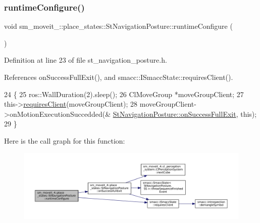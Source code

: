 \subsubsection{\texorpdfstring{runtime\+Configure()}{runtimeConfigure()}}
{\footnotesize\ttfamily void sm\+\_\+moveit\+\_\+::place\+\_\+states\+::\+St\+Navigation\+Posture\+::runtime\+Configure (\begin{DoxyParamCaption}{ }\end{DoxyParamCaption})\hspace{0.3cm}{\ttfamily [inline]}}



Definition at line 23 of file st\+\_\+navigation\+\_\+posture.\+h.



References on\+Success\+Full\+Exit(), and smacc\+::\+I\+Smacc\+State\+::requires\+Client().


\begin{DoxyCode}
24             \{
25                 ros::WallDuration(2).sleep();
26                 ClMoveGroup *moveGroupClient;
27                 this->\hyperlink{classsmacc_1_1ISmaccState_a7f95c9f0a6ea2d6f18d1aec0519de4ac}{requiresClient}(moveGroupClient);
28                 moveGroupClient->onMotionExecutionSuccedded(&
      \hyperlink{structsm__moveit__4_1_1place__states_1_1StNavigationPosture_a95ab74dae51538aeae46f71b515bc61e}{StNavigationPosture::onSuccessFullExit}, \textcolor{keyword}{this});
29             \}
\end{DoxyCode}
Here is the call graph for this function\+:
\nopagebreak
\begin{figure}[H]
\begin{center}
\leavevmode
\includegraphics[width=350pt]{structsm__moveit__4_1_1place__states_1_1StNavigationPosture_aaf8ca02fa5a8185baf6bfc55731b1926_cgraph}
\end{center}
\end{figure}
\mbox{\label{structsm__moveit__4_1_1place__states_1_1StNavigationPosture_a29ac0c6cd858bb59ca3bc103da13b0a0}} 
